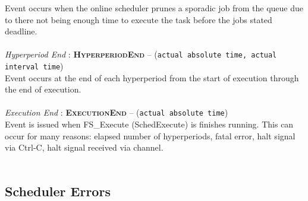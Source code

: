 Event occurs when the online scheduler prunes a sporadic job from the queue due to there not being enough time to execute the task before the jobs stated deadline.
\\
\\
\textit{Hyperperiod End} : \textbf{\textsc{HyperperiodEnd}} -- (\texttt{actual absolute time, actual interval time})\\
Event occurs at the end of each hyperperiod from the start of execution through the end of execution. 
\\
\\
\textit{Execution End} : \textbf{\textsc{ExecutionEnd}} -- (\texttt{actual absolute time})\\
Event is issued when FS\_Execute (SchedExecute) is finishes running.  This can occur for many reasons: elapsed number of hyperperiods, fatal error, halt signal via Ctrl-C, halt signal received via channel.
\\
\\

\subsection{Scheduler Errors}

